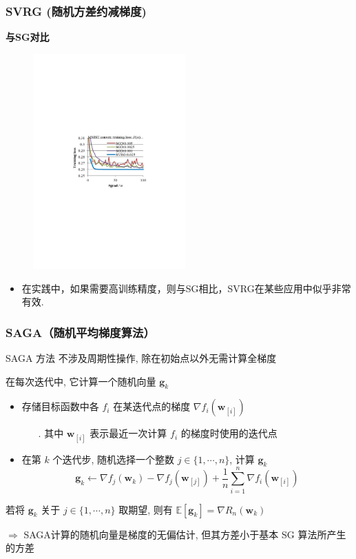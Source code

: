 \documentclass[handout]{beamer}
\begin{document}
\begin{frame}
\frametitle{SVRG (随机方差约减梯度)}

\textbf{\color{dblue}与SG对比}

\begin{figure}
  \centering
  \includegraphics[width=2.3in ]{./figure/SVRG.pdf}\\
\end{figure}
\begin{itemize}
\item
在实践中，如果需要高训练精度，则与SG相比，SVRG在某些应用中似乎非常有效.


\end{itemize}
\end{frame}



\begin{frame}[fragile]
  \frametitle{SAGA（随机平均梯度算法）}

SAGA 方法 不涉及周期性操作, 除在初始点以外无需计算全梯度

在每次迭代中, 它计算一个随机向量 $\boldsymbol{g}_k$ 
\begin{itemize}
  \item 存储目标函数中各 $f_i$ 在某迭代点的梯度 $\nabla f_i\left(\boldsymbol{w}_{[i]}\right)$
  \begin{itemize}
  \item[.]  其中 $\boldsymbol{w}_{[i]}$ 表示最近一次计算 $f_i$ 的梯度时使用的迭代点
  \end{itemize}
  \item 在第 $k$ 个迭代步, 随机选择一个整数 $j \in\{1, \cdots, n\}$, 计算 $\boldsymbol{g}_k$
  $$
  \boldsymbol{g}_k \leftarrow \nabla f_j\left(\boldsymbol{w}_k\right)-\nabla f_j\left(\boldsymbol{w}_{[j]}\right)+\frac{1}{n} \sum_{i=1}^n \nabla f_i\left(\boldsymbol{w}_{[i]}\right)
  $$
\end{itemize}
 
  \bigskip

  若将 $\boldsymbol{g}_k$ 关于 $j \in\{1, \cdots, n\}$ 取期望, 则有 $\mathbb{E}\left[\boldsymbol{g}_k\right]=\nabla R_n\left(\boldsymbol{w}_k\right)$

  $\Rightarrow$ SAGA计算的随机向量是梯度的无偏估计, 但其方差小于基本 SG 算法所产生的方差

\end{frame}
\end{document}
